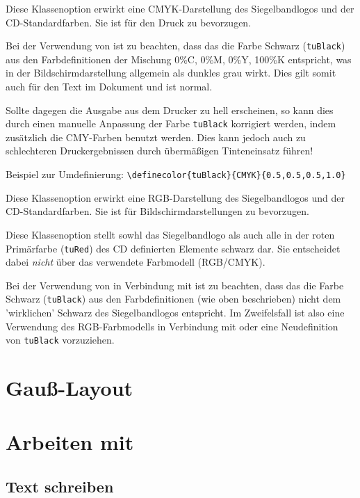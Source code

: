 \begin{Declaration}
\end{Declaration}

Diese Klassenoption erwirkt eine CMYK-Darstellung des Siegelbandlogos und der
CD-Standardfarben. Sie ist für den Druck zu bevorzugen.

\begin{important}
  Bei der Verwendung von  ist zu beachten,
  dass das die Farbe Schwarz (\texttt{tuBlack})
  aus den Farbdefinitionen der Mischung 0\%C, 0\%M, 0\%Y, 100\%K entspricht,
  was in der Bildschirmdarstellung allgemein als dunkles grau wirkt. Dies
  gilt somit auch für den Text im Dokument und ist normal.

  Sollte dagegen die Ausgabe aus dem Drucker zu hell erscheinen, so kann dies
  durch einen manuelle Anpassung der Farbe \texttt{tuBlack} korrigiert werden,
  indem zusätzlich die CMY-Farben benutzt werden. Dies kann jedoch auch zu
  schlechteren Druckergebnissen durch übermäßigen Tinteneinsatz führen!
  
  Beispiel zur Umdefinierung:
  \lstinline!\definecolor{tuBlack}{CMYK}{0.5,0.5,0.5,1.0}!
\end{important}

\begin{Declaration}
\end{Declaration}

Diese Klassenoption erwirkt eine RGB-Darstellung des Siegelbandlogos und der
CD-Standardfarben. Sie ist für Bildschirmdarstellungen zu bevorzugen.

\begin{Declaration}
\end{Declaration}

Diese Klassenoption stellt sowhl das Siegelbandlogo als auch alle in der
roten Primärfarbe (\texttt{tuRed}) des CD definierten Elemente schwarz dar.
Sie entscheidet dabei \emph{nicht} über das verwendete Farbmodell (RGB/CMYK).
\begin{important}
  Bei der Verwendung von  in Verbindung mit 
  ist zu beachten, dass das die Farbe Schwarz (\texttt{tuBlack})
  aus den Farbdefinitionen (wie oben beschrieben) nicht dem 'wirklichen' Schwarz
  des Siegelbandlogos entspricht.
  Im Zweifelsfall ist also eine Verwendung des RGB-Farbmodells in Verbindung
  mit  oder eine Neudefinition von \texttt{tuBlack} vorzuziehen.
\end{important}

\section{Gauß-Layout}\label{sec:gausspage}


\section{Arbeiten mit \tubslatex}

\subsection{Text schreiben}





